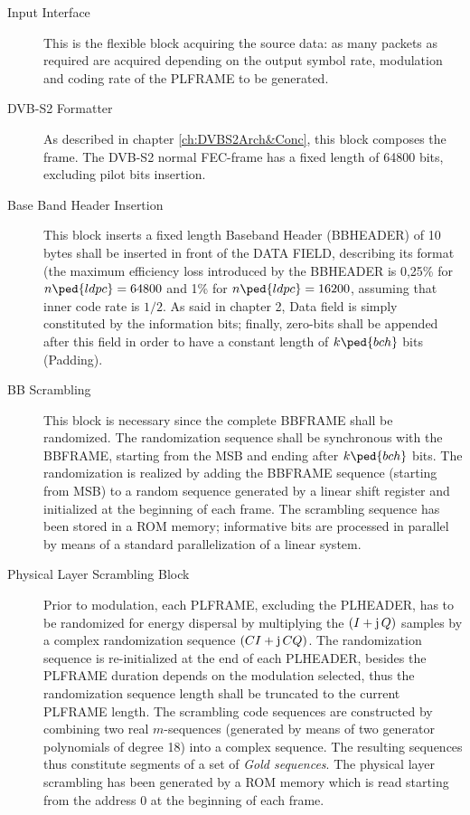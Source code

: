 \begin{description}
\item[Input Interface] This is the flexible block acquiring the source data: as many packets as required are acquired  depending on the output symbol rate, modulation and coding rate of the PLFRAME to be generated.

\item[DVB-S2 Formatter] As described in chapter \ref{ch:DVBS2Arch&Conc}, this block composes the frame. The DVB-S2 normal FEC-frame has a fixed length of 64800 bits, excluding pilot bits insertion.

\item[Base Band Header Insertion] This block inserts a fixed length Baseband Header (BBHEADER) of 10 bytes shall be inserted in front of the DATA FIELD, describing its format (the maximum efficiency loss introduced by the BBHEADER is 0,25\% for \(n\ped{ldpc}=64800\) and 1\% for \(n\ped{ldpc}=16200\), assuming that inner code rate is \(1/2\). As said in chapter 2, Data field is simply constituted by the information bits; finally, zero-bits shall be appended after this field in order to have a constant length of \(k\ped{bch}\) bits (Padding).

\item[BB Scrambling] This block is necessary since the complete BBFRAME shall be randomized. The randomization sequence shall be synchronous with the BB\-FRAME, starting from the MSB and ending after \(k\ped{bch}\) bits. The randomization is realized by adding the BBFRAME sequence (starting from MSB) to a random sequence generated by a linear shift register and initialized at the beginning of each frame. The scrambling sequence has been stored in a ROM memory; informative bits are processed in parallel by means of a standard parallelization of a linear system.

\item[Physical Layer Scrambling Block] Prior to modulation, each PLFRAME, excluding the PLHEADER, has to be randomized for energy dispersal by multiplying the \((I+ \operatorname{\mathrm{j\mathstrut}} Q)\) samples by a complex randomization sequence \((CI+ \operatorname{\mathrm{j\mathstrut}} CQ)\). The randomization sequence is re-initialized at the end of each PLHEADER, besides the PLFRAME duration depends on the modulation selected, thus the randomization sequence length shall be truncated to the current PLFRAME length. The scrambling code sequences are constructed by combining two real \(m\)-sequences (generated by means of two generator polynomials of degree 18) into a complex sequence. The resulting sequences thus constitute segments of a set of \emph{Gold sequences}. The physical layer scrambling has been generated by a ROM memory which is read starting from the address 0 at the beginning of each frame.


\end{description}
